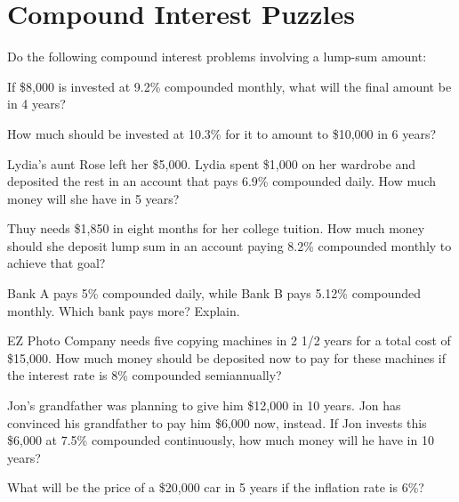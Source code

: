\section{Compound Interest Puzzles}

Do the following compound interest problems involving a lump-sum amount:

\begin{puzzle}
    If \$8,000 is invested at 9.2\% compounded monthly, what will the final amount be in 4 years?
\end{puzzle}

\begin{puzzle}
    How much should be invested at 10.3\% for it to amount to \$10,000 in 6 years?
\end{puzzle}

\begin{puzzle}
    Lydia’s aunt Rose left her \$5,000. Lydia spent \$1,000 on her wardrobe and deposited the rest in an account that pays 6.9\% compounded daily. How much money will she have in 5 years?
\end{puzzle}

\begin{puzzle}
    Thuy needs \$1,850 in eight months for her college tuition. How much money should she deposit lump sum in an account paying 8.2\% compounded monthly to achieve that goal?
\end{puzzle}

\begin{puzzle}
    Bank A pays 5\% compounded daily, while Bank B pays 5.12\% compounded monthly. Which bank pays more? Explain.
\end{puzzle}

\begin{puzzle}
    EZ Photo Company needs five copying machines in 2 1/2 years for a total cost of \$15,000. How much money should be deposited now to pay for these machines if the interest rate is 8\% compounded semiannually?
\end{puzzle}

\begin{puzzle}
    Jon’s grandfather was planning to give him \$12,000 in 10 years. Jon has convinced his grandfather to pay him \$6,000 now, instead. If Jon invests this \$6,000 at 7.5\% compounded continuously, how much money will he have in 10 years?
\end{puzzle}

\begin{puzzle}
    What will be the price of a \$20,000 car in 5 years if the inflation rate is 6\%?
\end{puzzle}

